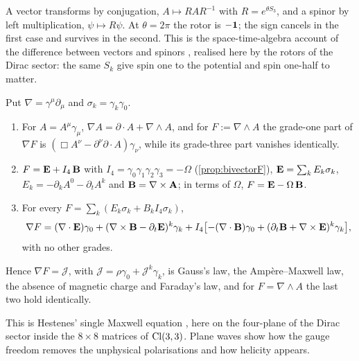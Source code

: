 A vector transforms by conjugation, $A\mapsto RAR^{-1}$ with $R=e^{\theta S_3}$, and a spinor by left multiplication,
$\psi\mapsto R\psi$. At $\theta=2\pi$ the rotor is $-\mathbf 1$; the sign cancels in the first case and survives in the second. This is the
space-time-algebra account of the difference between vectors and spinors \cite{Hestenes66}, realised here by the rotors of the Dirac
sector: the same $S_k$ give spin one to the potential and spin one-half to matter.

\begin{theorem}
\label{thm:nablaF}
Put $\nabla=\gamma^\mu\partial_\mu$ and $\sigma_k=\gamma_k\gamma_0$.
\begin{enumerate}[label=(\roman*),leftmargin=2.2em]
\item For $A=A^\mu\gamma_\mu$, $\nabla A=\partial\cdot A+\nabla\wedge A$, and for $F:=\nabla\wedge A$ the grade-one part of $\nabla F$ is
$(\Box A^\nu-\partial^\nu\partial\cdot A)\gamma_\nu$, while its grade-three part vanishes identically.
\item $F=\mathbf E+I_4\,\mathbf B$ with $I_4=\gamma_0\gamma_1\gamma_2\gamma_3=-\Omega$ (\cref{prop:bivectorF}), $\mathbf E=\sum_kE_k\sigma_k$,
$E_k=-\partial_kA^0-\partial_tA^k$ and $\mathbf B=\nabla\times\mathbf A$; in terms of $\Omega$, $F=\mathbf E-\Omega\,\mathbf B$.
\item For every $F=\sum_k(E_k\sigma_k+B_kI_4\sigma_k)$,
\[
\nabla F=(\nabla\cdot\mathbf E)\gamma_0+(\nabla\times\mathbf B-\partial_t\mathbf E)^k\gamma_k+I_4\bigl[-(\nabla\cdot\mathbf B)\gamma_0+(\partial_t\mathbf B+\nabla\times\mathbf E)^k\gamma_k\bigr],
\]
with no other grades.
\end{enumerate}
Hence $\nabla F=\mathcal J$, with $\mathcal J=\rho\gamma_0+\mathcal J^k\gamma_k$, is Gauss's law, the Amp\`ere--Maxwell law, the absence of
magnetic charge and Faraday's law, and for $F=\nabla\wedge A$ the last two hold identically.
\end{theorem}

This is Hestenes' single Maxwell equation \cite{Hestenes66}, here on the four-plane of the Dirac sector inside the $8\times8$ matrices
of $\mathrm{Cl}(3,3)$. Plane waves show how the gauge freedom removes the unphysical polarisations and how helicity appears.

